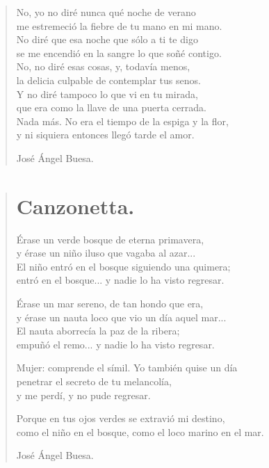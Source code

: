 \documentclass[11pt, portrait, twoside, notitlepage, openright]{book}
\begin{document}
\begin{verse}
No, yo no diré nunca qué noche de verano\\
me estremeció la fiebre de tu mano en mi mano.\\
No diré que esa noche que sólo a ti te digo\\
se me encendió en la sangre lo que soñé contigo.\\
No, no diré esas cosas, y, todavía menos,\\
la delicia culpable de contemplar tus senos.\\
Y no diré tampoco lo que vi en tu mirada,\\
que era como la llave de una puerta cerrada.\\
Nada más. No era el tiempo de la espiga y la flor,\\
y ni siquiera entonces llegó tarde el amor.
\newline
\begin{flushright}
José Ángel Buesa.
\end{flushright}
\end{verse}

\newpage
\begin{verse}
\begin{center}
\section{Canzonetta.}
\end{center}
Érase un verde bosque de eterna primavera,\\
y érase un niño iluso que vagaba al azar...\\
El niño entró en el bosque siguiendo una quimera;\\
entró en el bosque... y nadie lo ha visto regresar.
\newline

Érase un mar sereno, de tan hondo que era,\\
y érase un nauta loco que vio un día aquel mar...\\
El nauta aborrecía la paz de la ribera;\\
empuñó el remo... y nadie lo ha visto regresar.
\newline

Mujer: comprende el símil. Yo también quise un día\\
penetrar el secreto de tu melancolía,\\
y me perdí, y no pude regresar.
\newline

Porque en tus ojos verdes se extravió mi destino,\\
como el niño en el bosque, como el loco marino en el mar.
\newline

\begin{flushright}
José Ángel Buesa.
\end{flushright}
\end{verse}
\end{document}
